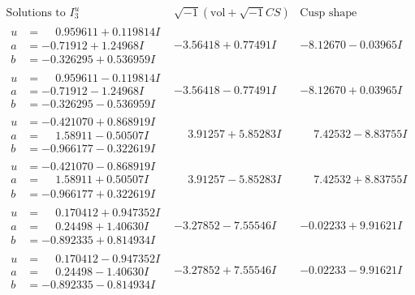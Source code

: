 \documentclass[1p]{elsarticle_modified}
\theoremstyle{definition}
\newcommand{\I}{\sqrt{-1}}
\begin{document}
$$\begin{array}{c|c|c}  
\text{Solutions to }I^u_{3}& \I (\text{vol} + \sqrt{-1}CS) & \text{Cusp shape}\\
 \hline 
\begin{aligned}
u &= \phantom{-}0.959611 + 0.119814 I \\
a &= -0.71912 + 1.24968 I \\
b &= -0.326295 + 0.536959 I\end{aligned}
 & -3.56418 + 0.77491 I & -8.12670 - 0.03965 I \\ \hline\begin{aligned}
u &= \phantom{-}0.959611 - 0.119814 I \\
a &= -0.71912 - 1.24968 I \\
b &= -0.326295 - 0.536959 I\end{aligned}
 & -3.56418 - 0.77491 I & -8.12670 + 0.03965 I \\ \hline\begin{aligned}
u &= -0.421070 + 0.868919 I \\
a &= \phantom{-}1.58911 - 0.50507 I \\
b &= -0.966177 - 0.322619 I\end{aligned}
 & \phantom{-}3.91257 + 5.85283 I & \phantom{-}7.42532 - 8.83755 I \\ \hline\begin{aligned}
u &= -0.421070 - 0.868919 I \\
a &= \phantom{-}1.58911 + 0.50507 I \\
b &= -0.966177 + 0.322619 I\end{aligned}
 & \phantom{-}3.91257 - 5.85283 I & \phantom{-}7.42532 + 8.83755 I \\ \hline\begin{aligned}
u &= \phantom{-}0.170412 + 0.947352 I \\
a &= \phantom{-}0.24498 + 1.40630 I \\
b &= -0.892335 + 0.814934 I\end{aligned}
 & -3.27852 - 7.55546 I & -0.02233 + 9.91621 I \\ \hline\begin{aligned}
u &= \phantom{-}0.170412 - 0.947352 I \\
a &= \phantom{-}0.24498 - 1.40630 I \\
b &= -0.892335 - 0.814934 I\end{aligned}
 & -3.27852 + 7.55546 I & -0.02233 - 9.91621 I \\ \hline\begin{aligned}

\end{aligned}
\end{array}$$
\end{document}
